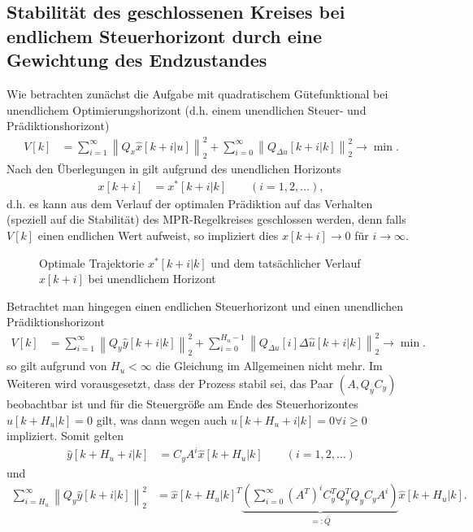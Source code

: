 \subsection{Stabilität des geschlossenen Kreises bei endlichem Steuerhorizont durch eine Gewichtung des Endzustandes}
Wie betrachten zunächst die Aufgabe mit quadratischem Gütefunktional bei unendlichem Optimierungshorizont (d.h. einem unendlichen Steuer- und Prädiktionshorizont)
\begin{align}
	V[k] & = \sum\limits_{i=1}^{\infty}\left\| Q_x\hat{x}[k+i|u] \right\|_2^2 + \sum\limits_{i=0}^{\infty}\left\|Q_{\Delta u}[k+i|k] \right\|_2^2\rightarrow \min .
\end{align}
Nach den Überlegungen in  gilt aufgrund des unendlichen Horizonts
\begin{align}
	x[k+i] & = x^{\ast}[k+i|k]\qquad (i=1,2,\ldots),\label{eqn:kap_4_x_normal_geschaetzt}
\end{align}
d.h. es kann aus dem Verlauf der optimalen Prädiktion auf das Verhalten (speziell auf die Stabilität) des \ac{MPR}-Regelkreises geschlossen werden, denn falls $V[k]$ einen endlichen
Wert aufweist, so impliziert dies $x[k+i]\rightarrow 0$ für $i\rightarrow\infty$.
\begin{figure}[htb]
	\centering
	
	\caption{Optimale Trajektorie $x^{\ast}[k+i|k]$ und dem tatsächlicher Verlauf $x[k+i]$ bei unendlichem Horizont}
	\label{fig:kap_4_abweichung_opt_tatsaechlich_verlauf_unendl}
\end{figure}
Betrachtet man hingegen einen endlichen Steuerhorizont und einen unendlichen Prädiktionshorizont
\begin{align}
	V[k] & = \sum\limits_{i=1}^{\infty}\left\| Q_y\hat{y}[k+i|k] \right\|_2^2 + \sum\limits_{i=0}^{H_u-1}\left\| Q_{\Delta u}[i]\Delta \hat{u}[k+i|k]\right\|_2^2\rightarrow\min .
\end{align}
so gilt aufgrund von $H_u<\infty$ die Gleichung  im Allgemeinen nicht mehr. Im Weiteren wird vorausgesetzt, dass der Prozess stabil sei, das Paar
$(A,Q_yC_y)$ beobachtbar ist und für die Steuergröße am Ende des Steuerhorizontes $\hat{u}[k+H_u|k]=0$ gilt, was dann wegen  auch
$\hat{u}[k+H_u+i|k]=0\forall i\ge 0$ impliziert. Somit gelten
\begin{align*}
	\hat{y}[k+H_u+i|k] & =  C_yA^i\hat{x}[k+H_u|k]\qquad (i=1,2,\ldots)
\end{align*}
und
\begin{align*}
	\sum\limits_{i=H_u}^{\infty}\left\| Q_y\hat{y}[k+i|k]\right\|_2^2 & = \hat{x}[k+H_u|k]^T\underbrace{ \left(\sum\limits_{i=0}^{\infty}\left(A^T\right)^iC_y^TQ_y^TQ_yC_yA^i\right)
	}_{=:\bar{Q}}\hat{x}[k+H_u|k].
\end{align*}
